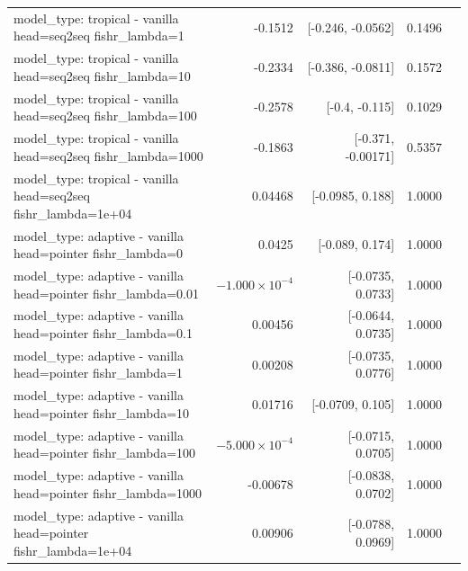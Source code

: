 \documentclass[10pt]{article}
\makeatletter
\newcommand{\stackcell}[1]{\begin{tabular}[t]{@{}l@{}}#1\end{tabular}}
\makeatother
\begin{document}
{\begin{longtable}{lrrrl}
\stackcell{model\_type: tropical - vanilla\\\footnotesize head=seq2seq fishr\_lambda=1 } & -0.1512 & [-0.246, -0.0562] & 0.1496 & \\
\stackcell{model\_type: tropical - vanilla\\\footnotesize head=seq2seq fishr\_lambda=10 } & -0.2334 & [-0.386, -0.0811] & 0.1572 & \\
\stackcell{model\_type: tropical - vanilla\\\footnotesize head=seq2seq fishr\_lambda=100 } & -0.2578 & [-0.4, -0.115] & 0.1029 & \\
\stackcell{model\_type: tropical - vanilla\\\footnotesize head=seq2seq fishr\_lambda=1000 } & -0.1863 & [-0.371, -0.00171] & 0.5357 & \\
\stackcell{model\_type: tropical - vanilla\\\footnotesize head=seq2seq fishr\_lambda=1e+04 } & 0.04468 & [-0.0985, 0.188] & 1.0000 & \\
\stackcell{model\_type: adaptive - vanilla\\\footnotesize head=pointer fishr\_lambda=0 } & 0.0425 & [-0.089, 0.174] & 1.0000 & \\
\stackcell{model\_type: adaptive - vanilla\\\footnotesize head=pointer fishr\_lambda=0.01 } & $-1.000\times10^{-4}$ & [-0.0735, 0.0733] & 1.0000 & \\
\stackcell{model\_type: adaptive - vanilla\\\footnotesize head=pointer fishr\_lambda=0.1 } & 0.00456 & [-0.0644, 0.0735] & 1.0000 & \\
\stackcell{model\_type: adaptive - vanilla\\\footnotesize head=pointer fishr\_lambda=1 } & 0.00208 & [-0.0735, 0.0776] & 1.0000 & \\
\stackcell{model\_type: adaptive - vanilla\\\footnotesize head=pointer fishr\_lambda=10 } & 0.01716 & [-0.0709, 0.105] & 1.0000 & \\
\stackcell{model\_type: adaptive - vanilla\\\footnotesize head=pointer fishr\_lambda=100 } & $-5.000\times10^{-4}$ & [-0.0715, 0.0705] & 1.0000 & \\
\stackcell{model\_type: adaptive - vanilla\\\footnotesize head=pointer fishr\_lambda=1000 } & -0.00678 & [-0.0838, 0.0702] & 1.0000 & \\
\stackcell{model\_type: adaptive - vanilla\\\footnotesize head=pointer fishr\_lambda=1e+04 } & 0.00906 & [-0.0788, 0.0969] & 1.0000 & \\

\end{longtable}}
\end{document}
